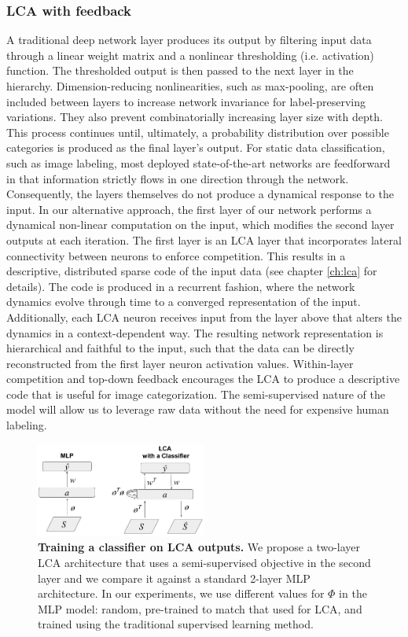 \subsubsection{LCA with feedback}
A traditional deep network layer produces its output by filtering input data through a linear weight matrix and a nonlinear thresholding (i.e. activation) function. The thresholded output is then passed to the next layer in the hierarchy. Dimension-reducing nonlinearities, such as max-pooling, are often included between layers to increase network invariance for label-preserving variations. They also prevent combinatorially increasing layer size with depth. This process continues until, ultimately, a probability distribution over possible categories is produced as the final layer’s output. For static data classification, such as image labeling, most deployed state-of-the-art networks are feedforward in that information strictly flows in one direction through the network. Consequently, the layers themselves do not produce a dynamical response to the input. In our alternative approach, the first layer of our network performs a dynamical non-linear computation on the input, which modifies the second layer outputs at each iteration. The first layer is an LCA layer that incorporates lateral connectivity between neurons to enforce competition. This results in a descriptive, distributed sparse code of the input data (see chapter \ref{ch:lca} for details). The code is produced in a recurrent fashion, where the network dynamics evolve through time to a converged representation of the input. Additionally, each LCA neuron receives input from the layer above that alters the dynamics in a context-dependent way. The resulting network representation is hierarchical and faithful to the input, such that the data can be directly reconstructed from the first layer neuron activation values. Within-layer competition and top-down feedback encourages the LCA to produce a descriptive code that is useful for image categorization. The semi-supervised nature of the model will allow us to leverage raw data without the need for expensive human labeling.

\begin{figure}[h]
    \centering
    \includegraphics[width=0.5\textwidth]{figures/mlp_lcaf_architectures.png}
    \caption{\textbf{Training a classifier on LCA outputs.} We propose a two-layer LCA architecture that uses a semi-supervised objective in the second layer and we compare it against a standard 2-layer MLP architecture. In our experiments, we use different values for $\Phi$ in the MLP model: random, pre-trained to match that used for LCA, and trained using the traditional supervised learning method.}
    \label{fig:ch3_mlp_lcaf_architectures}
\end{figure}

